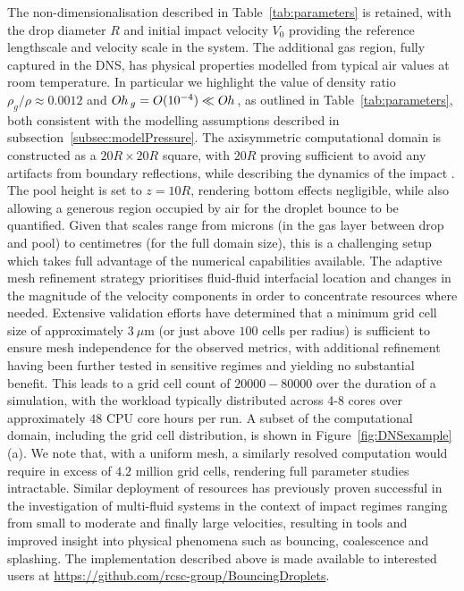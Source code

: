 \documentclass{jfm}
\begin{document}
The non-dimensionalisation described in Table~\ref{tab:parameters} is retained, with the drop diameter $R$ and initial impact velocity $V_0$ providing the reference lengthscale and velocity scale in the system. The additional gas region, fully captured in the DNS, has physical properties modelled from typical air values at room temperature. In particular we highlight the value of density ratio $\rho_g/\rho \approx 0.0012$ and $O\kern-0.04em h\,_g = O(10^{-4}) \ll O\kern-0.04em h\,$, as outlined in Table~\ref{tab:parameters}, both consistent with the modelling assumptions described in subsection~\ref{subsec:modelPressure}. The axisymmetric computational domain is constructed as a $20R \times 20R$ square, with $20R$ proving sufficient to avoid any artifacts from boundary reflections, while describing the dynamics of the impact \citep{galeano2021capillary}. The pool height is set to $z=10R$, rendering bottom effects negligible, while also allowing a generous region occupied by air for the droplet bounce to be quantified. Given that scales range from microns (in the gas layer between drop and pool) to centimetres (for the full domain size), this is a challenging setup which takes full advantage of the numerical capabilities available. The adaptive mesh refinement strategy prioritises fluid-fluid interfacial location and changes in the magnitude of the velocity components in order to concentrate resources where needed. Extensive validation efforts have determined that a minimum grid cell size of approximately $3\ \mu$m (or just above $100$ cells per radius) is sufficient to ensure mesh independence for the observed metrics, with additional refinement having been further tested in sensitive regimes and yielding no substantial benefit. This leads to a grid cell count of $20000-80000$ over the duration of a simulation, with the workload typically distributed across 4-8 cores over approximately $48$ CPU core hours per run. A subset of the computational domain, including the grid cell distribution, is shown in Figure~\ref{fig:DNSexample}(a). We note that, with a uniform mesh, a similarly resolved computation would require in excess of $4.2$ million grid cells, rendering full parameter studies intractable. Similar deployment of resources has previously proven successful in the investigation of multi-fluid systems in the context of impact regimes ranging from small \citep{galeano2021capillary} to moderate \citep{fudge2021dipping} and finally large \citep{cimpeanu2018early} velocities, resulting in tools and improved insight into physical phenomena such as bouncing, coalescence and splashing. The implementation described above is made available to interested users at \url{https://github.com/rcsc-group/BouncingDroplets}.
\end{document}
